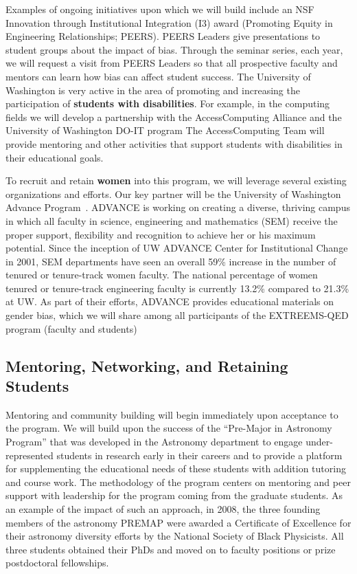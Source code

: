 Examples of ongoing initiatives upon which we will build include an
NSF Innovation through Institutional Integration (I3) award (Promoting
Equity in Engineering Relationships; PEERS). PEERS Leaders give
presentations to student groups about the impact of bias. Through the
seminar series, each year, we will request a visit from PEERS Leaders
so that all prospective faculty and mentors can learn how bias can
affect student success.  The University of Washington is very active
in the area of promoting and increasing the participation of {\bf
  students with disabilities}. For example, in the computing fields we
will develop a partnership with the AccessComputing Alliance
and the University
of Washington DO-IT program
The AccessComputing Team will provide mentoring and other activities
that support students with disabilities in their educational goals.

To recruit and retain {\bf women} into this program, we will leverage
several existing organizations and efforts.  Our key partner will be
the University of Washington Advance Program~\cite{x}.  ADVANCE is
working on creating a diverse, thriving campus in which all faculty in
science, engineering and mathematics (SEM) receive the proper support,
flexibility and recognition to achieve her or his maximum
potential. Since the inception of UW ADVANCE Center for Institutional
Change in 2001, SEM departments have seen an overall 59\% increase in
the number of tenured or tenure-track women faculty. The national
percentage of women tenured or tenure-track engineering faculty is
currently 13.2\% compared to 21.3\% at UW. As part of their efforts,
ADVANCE provides educational materials on gender bias, which we will
share among all participants of the EXTREEMS-QED program (faculty and
students)

\subsection{Mentoring, Networking, and Retaining Students}

Mentoring and community building will begin immediately upon
acceptance to the program. We will build upon the success of the
``Pre-Major in Astronomy Program''\cite{garner2010diversity} that was
developed in the Astronomy department to engage under-represented
students in research early in their careers and to provide a platform
for supplementing the educational needs of these students with
addition tutoring and course work. The methodology of the program
centers on mentoring and peer support with leadership for the program
coming from the graduate students.  As an example of the impact of
such an approach, in 2008, the three founding members of the astronomy
PREMAP were awarded a Certificate of Excellence for their astronomy
diversity efforts by the National Society of Black Physicists. All
three students obtained their PhDs and moved on to faculty positions
or prize postdoctoral fellowships.

